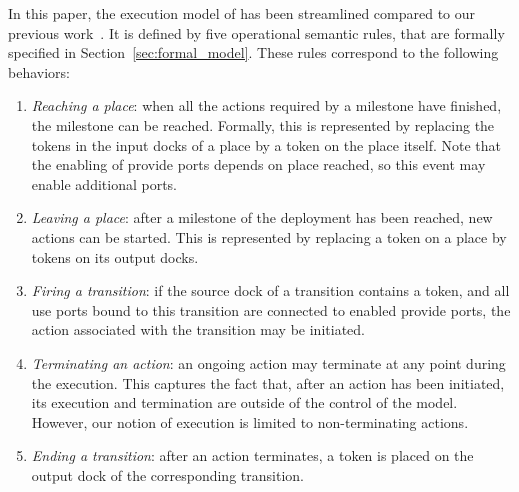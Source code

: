 In this paper, the execution model of \mad has been streamlined
compared to our previous work~\cite{chardet:hal-01858150}.  It is
defined by five operational semantic rules, that are formally
specified in Section~\ref{sec:formal_model}. These rules correspond to
the following behaviors:

\begin{enumerate}
\item \emph{Reaching a place}: when all the actions required by a
  milestone have finished, the milestone can be reached. Formally,
  this is represented by replacing the tokens in the input docks of a
  place by a token on the place itself. Note that the enabling of
  provide ports depends on place reached, so this event may enable
  additional ports.
\item \emph{Leaving a place}: after a milestone of the deployment has
  been reached, new actions can be started. This is represented by
  replacing a token on a place by tokens on its output docks.
\item \emph{Firing a transition}: if the source dock of a transition
  contains a token, and all use ports bound to this transition are
  connected to enabled provide ports, the action associated with the
  transition may be initiated.
\item \emph{Terminating an action}: an ongoing action may terminate at
  any point during the execution. This captures the fact that, after
  an action has been initiated, its execution and termination are
  outside of the control of the \mad model. However, our notion of
  execution is limited to non-terminating actions.
\item \emph{Ending a transition}: after an action terminates, a token
  is placed on the output dock of the corresponding transition.
\end{enumerate}

